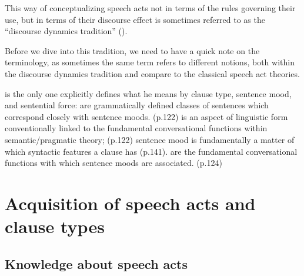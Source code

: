This way of conceptualizing speech acts not in terms of the rules governing their use, but in terms of their discourse effect is sometimes referred to as the “discourse dynamics tradition” (\cite{murraystarr2020}). 

Before we dive into this tradition, we need to have a quick note on the terminology, as sometimes the same term refers to different notions, both within the discourse dynamics tradition and compare to the classical speech act theories. 

\textcite{portner2018} is the only one explicitly defines what he means by clause type, sentence mood, and sentential force: 
\bxl
{} are grammatically defined classes of sentences which correspond closely with sentence moods. (p.122)
\ex{} is an aspect of linguistic form conventionally linked to the fundamental conversational functions within semantic/pragmatic theory; (p.122) sentence mood is fundamentally a matter of which syntactic features a clause has (p.141). 
\ex {} are the fundamental conversational functions with which sentence moods are associated. (p.124)
\exl
\eex



\section{Acquisition of speech acts and clause types}
\subsection{Knowledge about speech acts}


